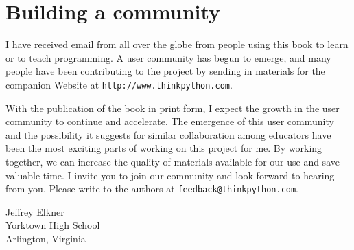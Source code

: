 \section*{Building a community}



I have received email from all over the globe from people using
this book to learn or to teach programming.  A user community has
begun to emerge, and many people have been contributing to the
project by sending in materials for the companion Website at
{\tt http://www.thinkpython.com}.

With the publication of the book in print form, I expect the growth in
the user community to continue and accelerate.  The emergence of this
user community and the possibility it suggests for similar
collaboration among educators have been the most exciting parts of
working on this project for me.  By working together, we can increase
the quality of materials available for our use and save valuable time.
I invite you to join our community and look forward to hearing from
you.  Please write to the authors at {\tt feedback@thinkpython.com}.

\vspace{0.25in}
\begin{flushleft}
Jeffrey Elkner\\
Yorktown High School\\
Arlington, Virginia\\
\end{flushleft}
